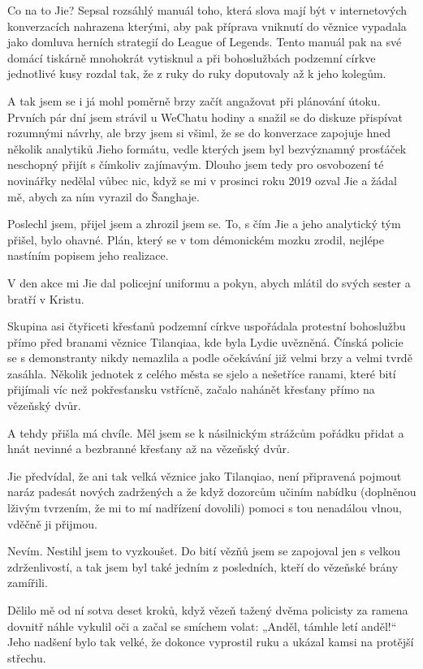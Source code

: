 Co na to Jie? Sepsal rozsáhlý manuál toho, která slova mají být v internetových konverzacích nahrazena kterými, aby pak příprava vniknutí do věznice vypadala jako domluva herních strategií do League of Legends. Tento manuál pak na své domácí tiskárně mnohokrát vytisknul a při bohoslužbách podzemní církve jednotlivé kusy rozdal tak, že z ruky do ruky doputovaly až k jeho kolegům.

A tak jsem se i já mohl poměrně brzy začít angažovat při plánování útoku. Prvních pár dní jsem strávil u WeChatu hodiny a snažil se do diskuze přispívat rozumnými návrhy, ale brzy jsem si všiml, že se do konverzace zapojuje hned několik analytiků Jieho formátu, vedle kterých jsem byl bezvýznamný prosťáček neschopný přijít s čímkoliv zajímavým.
Dlouho jsem tedy pro osvobození té novinářky nedělal vůbec nic, když se mi v prosinci roku 2019 ozval Jie a žádal mě, abych za ním vyrazil do Šanghaje.

Poslechl jsem, přijel jsem a zhrozil jsem se. To, s čím Jie a jeho analytický tým přišel, bylo ohavné. Plán, který se v tom démonickém mozku zrodil, nejlépe nastíním popisem jeho realizace.

V den akce mi Jie dal policejní uniformu a pokyn, abych mlátil do svých sester a bratří v Kristu. 

Skupina asi čtyřiceti křesťanů podzemní církve uspořádala protestní bohoslužbu přímo před branami věznice Tilanqiaa, kde byla Lydie uvězněná. Čínská policie se s demonstranty nikdy nemazlila a podle očekávání již velmi brzy a velmi tvrdě zasáhla. Několik jednotek z celého města se sjelo a nešetříce ranami, které bití přijímali víc než pokřesťansku vstřícně, začalo nahánět křesťany přímo na vězeňský dvůr.

A tehdy přišla má chvíle. Měl jsem se k násilnickým strážcům pořádku přidat a hnát nevinné a bezbranné křesťany až na vězeňský dvůr.

Jie předvídal, že ani tak velká věznice jako Tilanqiao, není připravená pojmout naráz padesát nových zadržených a že když dozorcům učiním nabídku (doplněnou lživým tvrzením, že mi to mí nadřízení dovolili) pomoci s tou nenadálou vlnou, vděčně ji přijmou.

 Nevím. Nestihl jsem to vyzkoušet. Do bití vězňů jsem se zapojoval jen s velkou zdrženlivostí, a tak jsem byl také jedním z posledních, kteří do vězeňské brány zamířili.
 
Dělilo mě od ní sotva deset kroků, když vězeň tažený dvěma policisty za ramena dovnitř náhle vykulil oči a začal se smíchem volat: „Anděl, támhle letí anděl!“ Jeho nadšení bylo tak velké, že dokonce vyprostil ruku a ukázal kamsi na protější střechu.

